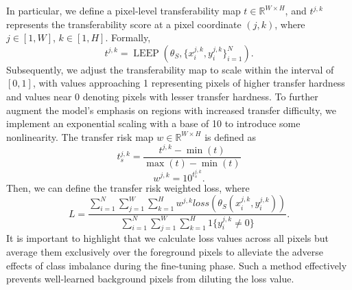 In particular, we define a pixel-level transferability map $t \in \mathbb{R}^{W\times H}$, and $t^{j,k}$ represents the transferability score at a pixel coordinate $(j,k)$, where $j \in [1,W]$, $k \in [1,H]$. Formally,
\begin{equation}
\label{transferability map}
   t^{j,k} = \operatorname{LEEP}(\theta_S,\{x_i^{j,k},y_i^{j,k} \}_{i=1}^{N}).
\end{equation}
Subsequently, we adjust the transferability map to scale within the interval of $[0, 1]$, with values approaching 1 representing pixels of higher transfer hardness and values near 0 denoting pixels with lesser transfer hardness. To further augment the model's emphasis on regions with increased transfer difficulty, we implement an exponential scaling with a base of 10 to introduce some nonlinearity. The transfer risk map $w \in \mathbb{R}^{W\times H}$ is defined as
\begin{equation}
\label{standerd transferability map}
   t_s^{j,k} = \frac{t^{j,k}-\min(t)}{\max(t)-\min(t)}
\end{equation}
\begin{equation}
\label{transferability risk map}
    w^{j,k} = 10^{t_s^{j,k}}.
\end{equation}
Then, we can define the transfer risk weighted loss, where
\begin{equation}
\label{transferability risk loss}
   L = \frac{\sum_{i = 1}^{N}\sum_{j = 1}^{W}\sum_{k = 1}^{H}w^{j,k}loss(\theta_S(x_i^{j,k},y_i^{j,k}))}{\sum_{i = 1}^{N}\sum_{j = 1}^{W}\sum_{k = 1}^{H}1\{y_i^{j,k} \not= 0\}}.
\end{equation}
It is important to highlight that we calculate loss values across all pixels but average them exclusively over the foreground pixels to alleviate the adverse effects of class imbalance during the fine-tuning phase. Such a method effectively prevents well-learned background pixels from diluting the loss value.
